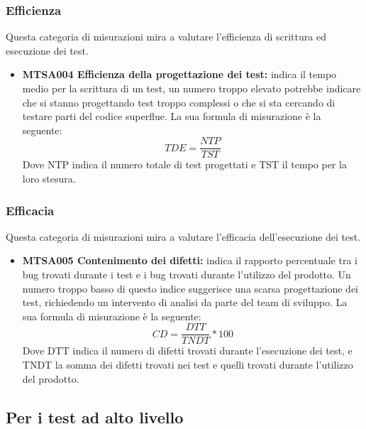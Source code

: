 \documentclass[NormeDiProgetto.tex]{subfiles}
\begin{document}
	\subsubsection{Efficienza}
	Questa categoria di misurazioni mira a valutare l'efficienza di scrittura ed esecuzione dei test.
	\begin{itemize}
		\item \textbf{MTSA004 Efficienza della progettazione dei test:} indica il tempo medio per la scrittura di un test, un numero troppo elevato potrebbe indicare che si stanno progettando test troppo complessi o che si sta cercando di testare parti del codice superflue. La sua formula di misurazione è la seguente:
		\[TDE=\dfrac{NTP}{TST}\]
		Dove NTP indica il numero totale di test progettati e TST il tempo per la loro stesura.

	\end{itemize}
	\subsubsection{Efficacia}
	Questa categoria di misurazioni mira a valutare l'efficacia dell'esecuzione dei test.
	\begin{itemize}
		\item \textbf{MTSA005 Contenimento dei difetti:} indica il rapporto percentuale tra i bug trovati durante i test e i bug trovati durante l'utilizzo del prodotto. Un numero troppo basso di questo indice suggerisce una scarsa progettazione dei test, richiedendo un intervento di analisi da parte del team di sviluppo. La sua formula di misurazione è la seguente:
		\[CD=\dfrac{DTT}{TNDT}*100\]
		Dove DTT indica il numero di difetti trovati durante l'esecuzione dei test, e TNDT la somma dei difetti trovati nei test e quelli trovati durante l'utilizzo del prodotto.
	\end{itemize}
	
	\subsection{Per i test ad alto livello}
\end{document}
